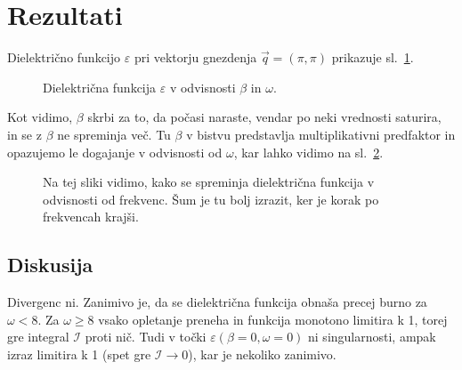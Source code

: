 \documentclass[a4paper, 12pt]{article}
\newcommand{\vq}{
	\ensuremath{\vec{q}}
}
\newcommand{\w}{
	\ensuremath{\omega}
}
\renewcommand{\ni}{
	\noindent
}
\newcommand{\I}{
	\ensuremath{\mathcal{I}}
}
\begin{document}
\section{Rezultati}

Dielektri\v cno funkcijo $\varepsilon$ pri vektorju gnezdenja $\vq = (\pi, \pi)$ prikazuje
sl.~\ref{sl2}.

\begin{figure}[H]
	\centering
	
	\caption{Dielektri\v cna funkcija $\varepsilon$ v odvisnosti $\beta$ in $\omega$.}
	\label{sl2}
\end{figure}

\ni Kot vidimo, $\beta$ skrbi za to, da po\v casi naraste, vendar po neki vrednosti saturira,
in se z $\beta$ ne spreminja ve\v c. Tu $\beta$ v bistvu predstavlja multiplikativni
predfaktor in opazujemo le dogajanje v odvisnosti od $\w$, kar lahko vidimo na sl.~\ref{sl1}.

\begin{figure}[H]
	\centering
	
	\caption{Na tej sliki vidimo, kako se spreminja dielektri\v cna funkcija v odvisnosti
		od frekvenc. \v Sum je tu bolj izrazit, ker je korak po frekvencah kraj\v si.}
	\label{sl1}
\end{figure}

\subsection{Diskusija}

Divergenc ni. Zanimivo je, da se dielektri\v cna funkcija obna\v sa precej burno za
$\w < 8$. Za $\w \geq 8$ vsako opletanje preneha in funkcija monotono limitira k 1, torej
gre integral $\I$ proti ni\v c. Tudi v to\v cki $\varepsilon (\beta = 0, \w = 0)$ ni
singularnosti, ampak izraz limitira k 1 (spet gre $\I \to 0$), kar je nekoliko zanimivo.
\end{document}
